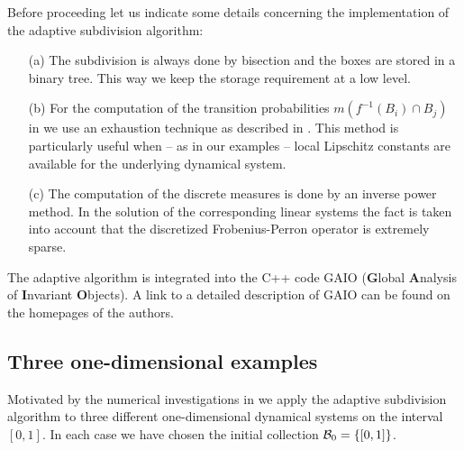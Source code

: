 \documentclass[cvs,envcountsect]{svjour}
\begin{document}
Before proceeding let us indicate some details concerning the implementation
of the adaptive subdivision algorithm:
\begin{itemize}
\item[(a)] The subdivision is always done by bisection and the boxes
are stored in a binary tree.  This way we keep the storage requirement
at a low level.
\item[(b)] For the computation of the transition probabilities
\linebreak $m(f^{-1}(B_i)\cap B_j)$ in 
we use an exhaustion technique as described in \cite{GDK}.  This method
is particularly useful when -- as in our examples -- local Lipschitz constants
are available for the underlying dynamical system.
\item[(c)] The computation of the discrete measures is done by an inverse
power method.  In the solution of the corresponding linear systems
the fact is taken into account that the discretized
Frobenius-Perron operator is extremely sparse.
\end{itemize}
The adaptive algorithm is integrated into the C++ code {\sf GAIO}
({\bf G}lobal {\bf A}nalysis of {\bf I}nvariant {\bf O}bjects).
A link to a detailed description of {\sf GAIO} can be found on
the homepages of the authors.


\subsection*{Three one-dimensional examples}
\label{subsec:1D}
%
Motivated by the numerical investigations in \cite{DingDuLi:93}
we apply the adaptive subdivision algorithm to three different
one-dimensional dynamical systems on the interval $[0,1]$.  In each
case we have chosen the initial collection $\cB_0=\{[0,1]\}$.
\end{document}
